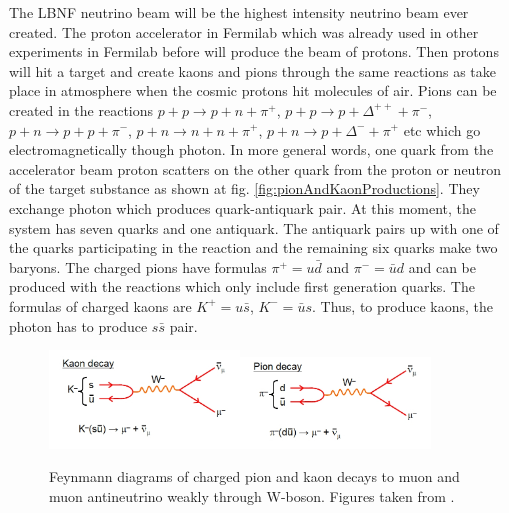 The LBNF neutrino beam will be the highest intensity neutrino beam ever created. The proton accelerator in Fermilab which was already used in other experiments in Fermilab before will produce the beam of protons. Then protons will hit a target and create kaons and pions through the same reactions as take place in atmosphere when the cosmic protons hit molecules of air.  Pions can be created in the reactions $p+p \rightarrow p+n+\pi^+$, $p+p \rightarrow p+\Delta^{++}+\pi^-$, $p+n \rightarrow p+p+\pi^-$, $p+n \rightarrow n+n+\pi^+$, $p+n \rightarrow p+\Delta^{-}+\pi^+$ etc which go electromagnetically though photon. In more general words, one quark from the accelerator beam proton scatters on the other quark from the proton or neutron of the target substance as shown at fig. \ref{fig:pionAndKaonProductions}. They exchange photon which produces quark-antiquark pair. At this moment, the system has seven quarks and one antiquark. The antiquark pairs up with one of the quarks participating in the reaction and the remaining six quarks make two baryons.  The charged pions have formulas $\pi^+ = u\bar{d}$ and $\pi^- = \bar{u}d$ and can be produced with the reactions which only include first generation quarks. The formulas of charged kaons are $K^+ = u\bar{s}$, $K^- = \bar{u}s$. Thus, to produce kaons, the photon has to produce $s\bar{s}$ pair. 

\begin{figure}
\caption{Feynmann diagrams of charged pion and kaon decays to muon and muon antineutrino weakly through W-boson. Figures taken from \cite{ref_fig_pionandKaonDecays}.}
\label{fig:pionAndKaonDecays}
\centering
\includegraphics[width=0.45\textwidth, keepaspectratio=true]{figs/kaonDecay.jpg}\includegraphics[width=0.45\textwidth, keepaspectratio=true]{figs/pionDecay.jpg} 
\end{figure}

